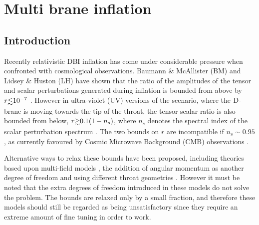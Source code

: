 \renewcommand{\CVSrevision}{\version$Id: multibrane.tex,v 1.34 2009/09/24 16:04:53 ith Exp $}

\chapter{Multi brane inflation}
\label{ch:multibrane}

\section{Introduction}
\label{sec:intro-multi}


Recently relativistic DBI inflation has come under considerable 
pressure when confronted with cosmological observations.  
Baumann \& McAllister (BM) and Lidsey \& Huston (LH) 
have shown that the ratio of the amplitudes of the 
tensor and scalar perturbations generated during 
inflation is bounded from above by $r \lsim 10^{-7}$
\cite{bmpaper,lidseyhuston}. 
However in ultra-violet (UV) versions of the scenario, where 
the ${\rm D}$-brane is moving towards the tip of the throat, the tensor-scalar 
ratio is also bounded from below, $r \gsim 0.1 (1-n_s)$, 
where $n_s$ denotes the spectral index 
of the scalar perturbation spectrum \cite{lidseyhuston}. 
The two bounds on $r$ are incompatible 
if $n_s \sim 0.95$, as currently favoured by Cosmic Microwave Background 
(CMB) observations \cite{spergel,Komatsu:2008hk}. 





Alternative ways to relax these bounds have been proposed, including
theories based upon multi-field models \cite{Huang:2007hh}, the addition of
angular momentum as another degree of freedom \cite{spinflation} and using
different throat geometries \cite{Gmeiner:2007uw}. However it must be noted that
the extra degrees of freedom introduced in these models do not solve the problem. The 
bounds are relaxed only by a small fraction, and therefore these models should still be 
regarded as being unsatisfactory since they require an extreme amount of fine tuning in order
to work.


